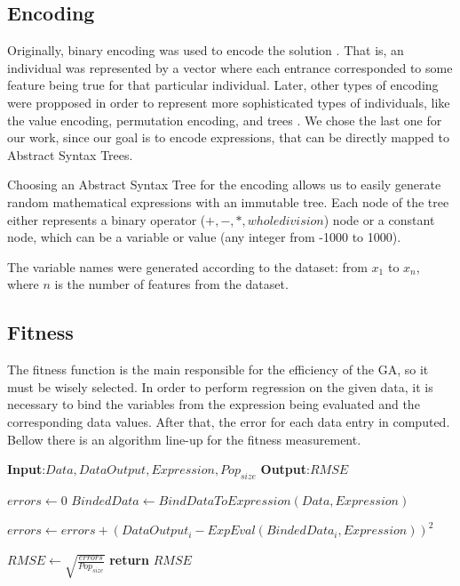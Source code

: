 \documentclass[runningheads]{llncs}
\begin{document}
\subsection{Encoding}


Originally, binary encoding was used to encode the solution \cite{whitley1994genetic}. That is, an individual was represented by a vector where each entrance corresponded to some feature being true for that particular individual. Later, other types of encoding were propposed in order to represent more sophisticated types of individuals, like the value encoding, permutation encoding, and trees \cite{martins2016gacuda}. We chose the last one for our work, since our goal is to encode expressions, that can be directly mapped to Abstract Syntax Trees.

Choosing an Abstract Syntax Tree for the encoding allows us to easily generate random mathematical expressions with an immutable tree. Each node of the tree either represents a binary operator ($+,-,*,whole division$) node or a constant node, which can be a variable or value (any integer from -1000 to 1000).

The variable names were generated according to the dataset: from $x_{1}$ to $x_{n}$, where $n$ is the number of features from the dataset.

\subsection{Fitness}

The fitness function is the main responsible for the efficiency of the GA, so it must be wisely selected. In order to perform regression on the given data, it is necessary to bind the variables from the expression being evaluated and the corresponding data values. After that, the error for each data entry in computed. Bellow there is an algorithm line-up for the fitness measurement.

\begin{algorithmic}

   \State \textbf{Input}:$Data,DataOutput,Expression,Pop_{size}$
   \State \textbf{Output}:$RMSE$
   
   \State $errors \gets 0$
   \State $BindedData \gets BindDataToExpression(Data,Expression)$
   
      \State $errors \gets errors + (DataOutput_{i} - ExpEval(BindedData_{i},Expression))^2$
   \EndFor
   
   \State $RMSE \gets \sqrt{\frac{errors}{Pop_{size}}}$
   \State \textbf{return} $RMSE$
\end{algorithmic}
\end{document}
